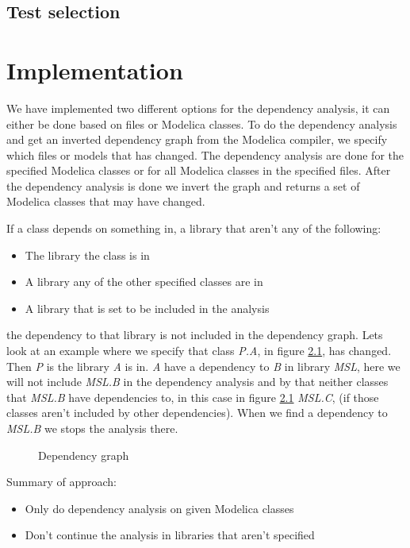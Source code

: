 \documentclass{cslthse-msc}
\begin{document}
\section{Test selection}

\chapter[Implementation]{Implementation}
We have implemented two different options for the dependency analysis, it can either be done based on files or Modelica classes. To do the dependency analysis and get an inverted dependency graph from the Modelica compiler, we specify which files or models that has changed. The dependency analysis are done for the specified Modelica classes or for all Modelica classes in the specified files. After the dependency analysis is done we invert the graph and returns a set of Modelica classes that may have changed.

If a class depends on something in, a library that aren't any of the following: 
\begin{itemize}
	\item The library the class is in
	\item A library any of the other specified classes are in
	\item A library that is set to be included in the analysis
\end{itemize}
the dependency to that library is not included in the dependency graph. Lets look at an example where we specify that class \textit{P.A}, in figure \ref{fig:libraryGraph}, has changed. Then \textit{P} is the library \textit{A} is in. \textit{A} have a dependency to \textit{B} in library \textit{MSL}, here we will not include \textit{MSL.B} in the dependency analysis and by that neither classes that \textit{MSL.B} have dependencies to, in this case in figure \ref{fig:libraryGraph} \textit{MSL.C}, (if those classes aren't included by other dependencies). When we find a dependency to \textit{MSL.B} we stops the analysis there.

\begin{figure}[H]
    \centering
    \caption{Dependency graph}
    \label{fig:libraryGraph}
\end{figure}

Summary of approach:
\begin{itemize}
	\item Only do dependency analysis on given Modelica classes
	\item Don't continue the analysis in libraries that aren't specified
\end{itemize}
\end{document}
